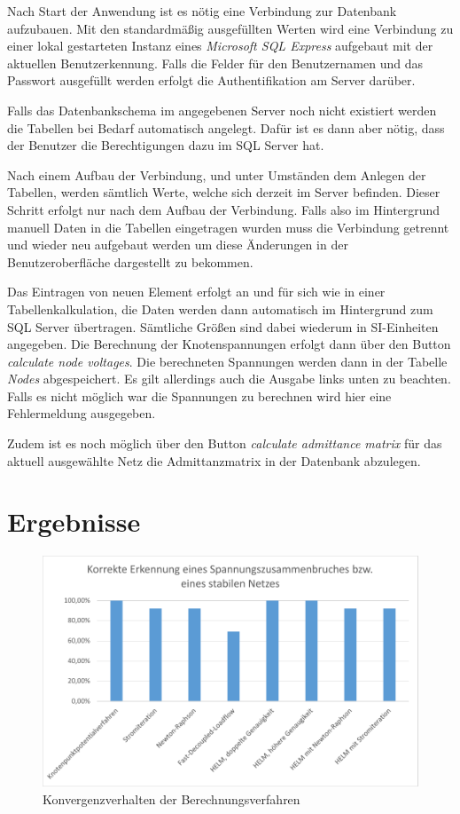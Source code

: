 \documentclass[12pt,a4paper]{article}
\begin{document}
	Nach Start der Anwendung ist es nötig eine Verbindung zur Datenbank aufzubauen. Mit den standardmäßig ausgefüllten Werten wird eine Verbindung zu einer lokal gestarteten Instanz eines \emph{Microsoft SQL Express} aufgebaut mit der aktuellen Benutzerkennung. Falls die Felder für den Benutzernamen und das Passwort ausgefüllt werden erfolgt die Authentifikation am Server darüber.
	
	Falls das Datenbankschema im angegebenen Server noch nicht existiert werden die Tabellen bei Bedarf automatisch angelegt. Dafür ist es dann aber nötig, dass der Benutzer die Berechtigungen dazu im SQL Server hat.
	
	Nach einem Aufbau der Verbindung, und unter Umständen dem Anlegen der Tabellen, werden sämtlich Werte, welche sich derzeit im Server befinden. Dieser Schritt erfolgt nur nach dem Aufbau der Verbindung. Falls also im Hintergrund manuell Daten in die Tabellen eingetragen wurden muss die Verbindung getrennt und wieder neu aufgebaut werden um diese Änderungen in der Benutzeroberfläche dargestellt zu bekommen.
	
	Das Eintragen von neuen Element erfolgt an und für sich wie in einer Tabellenkalkulation, die Daten werden dann automatisch im Hintergrund zum SQL Server übertragen. Sämtliche Größen sind dabei wiederum in SI-Einheiten angegeben. Die Berechnung der Knotenspannungen erfolgt dann über den Button \emph{calculate node voltages}. Die berechneten Spannungen werden dann in der Tabelle \emph{Nodes} abgespeichert. Es gilt allerdings auch die Ausgabe links unten zu beachten. Falls es nicht möglich war die Spannungen zu berechnen wird hier eine Fehlermeldung ausgegeben.
	
	Zudem ist es noch möglich über den Button \emph{calculate admittance matrix} für das aktuell ausgewählte Netz die Admittanzmatrix in der Datenbank abzulegen.
	
	\section{Ergebnisse}
	
	\begin{figure}
		\centering
		\includegraphics[scale=0.8]{pictures/convergence}
		\caption{Konvergenzverhalten der Berechnungsverfahren}
		\label{fig:convergence}
	\end{figure}
	
\end{document}
